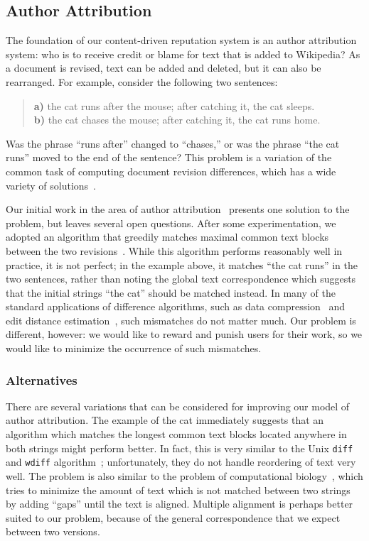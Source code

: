 \subsection{Author Attribution}

The foundation of our content-driven reputation system
is an author attribution system: who is to receive
credit or blame for text that is added to Wikipedia?
As a document is revised, text can be added and deleted,
but it can also be rearranged.
For example, consider the following two sentences:
\begin{quote}
\textbf{a)} the cat runs after the mouse; after catching it, the cat sleeps.
\\[0.5ex]
\textbf{b)} the cat chases the mouse; after catching it, the cat runs home.
\end{quote}
Was the phrase ``runs after'' changed to ``chases,''
or was the phrase ``the cat runs'' moved to the end of the sentence?
This problem is a variation of the common task of
computing document revision differences, which has a wide variety of
solutions~\cite{EditDist74, TichyEditDist, BurnsLong97}.

Our initial work in the area of author attribution~\cite{www07}
presents one solution to the problem, but leaves several
open questions.
After some experimentation, we adopted an algorithm that greedily
matches maximal common text blocks between the two
revisions~\cite{TichyEditDist}.
While this algorithm performs reasonably well in practice, it is not
perfect; in the example above, it matches ``the cat runs''
in the two sentences,
rather than noting the global text correspondence
which suggests that the initial strings ``the cat'' should
be matched instead.
In many of the standard applications of difference algorithms, such as data
compression~\cite{BurnsLong97} and edit distance
estimation~\cite{Levenshtein66,EditDist74,TichyEditDist,EditDistanceMoves},
such mismatches do not matter much.
Our problem is different, however: we would like to reward
and punish users for their work, so we would like to minimize
the occurrence of such mismatches.


\subsubsection{Alternatives}

There are several variations that can be
considered for improving our model of author attribution.
The example of the cat immediately suggests that an algorithm which
matches the longest common text blocks located anywhere in both
strings might perform better.
In fact, this is very similar to
the Unix {\tt diff\/} and {\tt wdiff\/}
algorithm~\cite{HuntMcIlroy75,Hirchberg77,Myers86};
unfortunately, they do not handle reordering of text very well.
The problem is also similar to the 
problem of computational biology~\cite{Align91,Gusfield97,Ssmall98},
which tries to minimize the amount of text which is not
matched between two strings by adding ``gaps'' until the
text is aligned.
Multiple alignment is perhaps better suited to our problem,
because of the general correspondence that we expect between
two versions.

